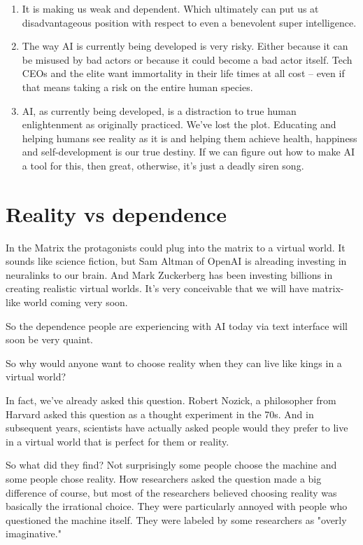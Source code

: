 \documentclass[11pt]{article}
\begin{document}
\begin{enumerate}
\item It is making us weak and dependent. Which ultimately can put us at disadvantageous position with respect to even a benevolent super intelligence.

\item The way AI is currently being developed is very risky. Either because it can be misused by bad actors or because it could become a bad actor itself. Tech CEOs and the elite want immortality in their life times at all cost -- even if that means taking a risk on the entire human species.

\item AI, as currently being developed, is a distraction to true human enlightenment as originally practiced. We've lost the plot. Educating and helping humans see reality as it is and helping them achieve health, happiness and self-development is our true destiny. If we can figure out how to make AI a tool for this, then great, otherwise, it's just a deadly siren song.
\end{enumerate}
\section{Reality vs dependence}
\label{sec:org8450655}

In the Matrix the protagonists could plug into the matrix to a virtual world. It sounds like science fiction, but Sam Altman of OpenAI is alreading investing in neuralinks to our brain. And Mark Zuckerberg has been investing billions in creating realistic virtual worlds. It's very conceivable that we will have matrix-like world coming very soon.

So the dependence people are experiencing with AI today via text interface will soon be very quaint.

So why would anyone want to choose reality when they can live like kings in a virtual world?

In fact, we've already asked this question. Robert Nozick, a philosopher from Harvard asked this question as a thought experiment in the 70s. And in subsequent years, scientists have actually asked people would they prefer to live in a virtual world that is perfect for them or reality.

So what did they find? Not surprisingly some people choose the machine and some people chose reality. How researchers asked the question made a big difference of course, but most of the researchers believed choosing reality was basically the irrational choice. They were particularly annoyed with people who questioned the machine itself. They were labeled by some researchers as "overly imaginative."
\end{document}
